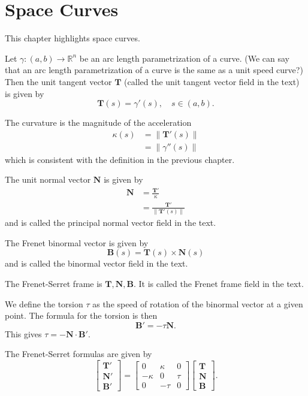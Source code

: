 \documentclass{book}
\begin{document}
	\chapter{Space Curves}
		This chapter highlights space curves.
		
		Let $\gamma:(a,b)\rightarrow\mathbb{R}^n$ be an arc length parametrization of a curve. (We can say that an arc length parametrization of a curve is the same as a unit speed curve?) Then the unit tangent vector $\mathbf{T}$ (called the unit tangent vector field in the text) is given by
		\begin{equation}
			\mathbf{T}(s)=\gamma'(s),\quad s\in(a,b)\mathrm{.}
		\end{equation}
		
		The curvature is the magnitude of the acceleration
		\begin{align}
			\kappa(s)&=\|\mathbf{T}'(s)\|\\
			&=\|\gamma''(s)\|
		\end{align}
		which is consistent with the definition in the previous chapter.
		
		The unit normal vector $\mathbf{N}$ is given by 
		\begin{align}
			\mathbf{N}&=\frac{\mathbf{T}'}{\kappa}\\
			&=\frac{\mathbf{T}'}{\|\mathbf{T}'(s)\|}
		\end{align}
		and is called the principal normal vector field in the text.
		
		The Frenet binormal vector is given by
		\begin{equation}
			\mathbf{B}(s)=\mathbf{T}(s)\times\mathbf{N}(s)
		\end{equation}
		and is called the binormal vector field in the text.
		
		The Frenet-Serret frame is ${\mathbf{T},\mathbf{N},\mathbf{B}}$. It is called the Frenet frame field in the text.
		
		We define the torsion $\tau$ as the speed of rotation of the binormal vector at a given point. The formula for the torsion is then
		\begin{equation}
			\mathbf{B}'=-\tau\mathbf{N}\mathrm{.}
		\end{equation}
		This gives $\tau=-\mathbf{N}\cdot\mathbf{B}'$.
		
		The Frenet-Serret formulas are given by
		\begin{equation}
			\begin{bmatrix}
				\mathbf{T}'\\
				\mathbf{N}'\\
				\mathbf{B}'
			\end{bmatrix}=
			\begin{bmatrix}
				0 & \kappa & 0\\
				-\kappa & 0 & \tau\\
				0 & -\tau & 0
			\end{bmatrix}
			\begin{bmatrix}
				\mathbf{T}\\
				\mathbf{N}\\
				\mathbf{B}
			\end{bmatrix}\mathrm{.}
		\end{equation}
\end{document}
